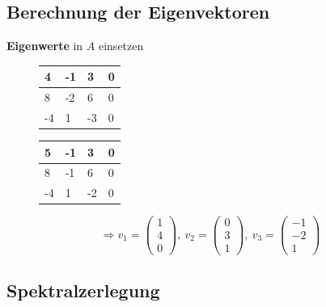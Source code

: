 \documentclass[11pt]{article}
\begin{document}
\subsection{Berechnung der Eigenvektoren}

\textbf{Eigenwerte} in $A$ einsetzen

\begin{figure}[H]
    \centering
    \begin{minipage}{.5\textwidth}
        \begin{table}[H]
\centering
\begin{tabular}{|p{0.5cm}|p{0.5cm}|p{0.5cm}||p{0.5cm}|}
\hline
4  & -1 & 3  & 0 \\ \hline
8  & -2 & 6  & 0 \\ \hline
-4 & 1  & -3 & 0 \\ \hline
\end{tabular}
\end{table}
    \end{minipage}%
    \begin{minipage}{0.5\textwidth}
\begin{table}[H]
\centering
\begin{tabular}{|p{0.5cm}|p{0.5cm}|p{0.5cm}||p{0.5cm}|}
\hline
5  & -1 & 3  & 0 \\ \hline
8  & -1 & 6  & 0 \\ \hline
-4 & 1  & -2 & 0 \\ \hline
\end{tabular}
\end{table}
    \end{minipage}
\end{figure}

\begin{equation*}
	\Rightarrow v_1 = \begin{pmatrix}
		1 \\ 4 \\ 0
	\end{pmatrix},\ v_2 = \begin{pmatrix}
		0 \\ 3 \\ 1
	\end{pmatrix},\ v_3 = \begin{pmatrix}
		-1 \\ -2 \\ 1
	\end{pmatrix}
\end{equation*}

\subsection{Spektralzerlegung}
\end{document}
